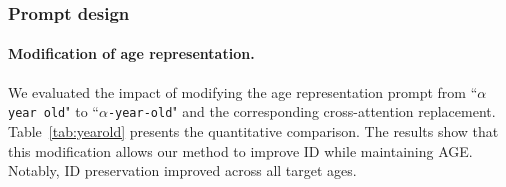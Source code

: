 \subsubsection{Prompt design}

\paragraph{
Modification of age representation.}
\label{sec:eval_yearold}

\begin{table*}[t]
  \centering
  \caption{
    Quantitative comparison of our method with and without hyphenation of age representation and the corresponding cross-attention replacement. 
    }
  \label{tab:yearold}
\end{table*}

We evaluated the impact of modifying the age representation prompt from ``\texttt{$\alpha$ year old}" to ``\texttt{$\alpha$-year-old}" and the corresponding cross-attention replacement. 
Table~\ref{tab:yearold} presents the quantitative comparison.
The results show that this modification allows our method to improve ID while maintaining AGE. Notably, ID preservation improved across all target ages.

